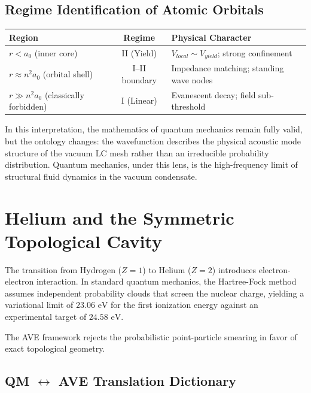 \subsection{Regime Identification of Atomic Orbitals}

\begin{center}
\small
\renewcommand{\arraystretch}{1.2}
\begin{tabular}{lcl}
\toprule
\textbf{Region} & \textbf{Regime} & \textbf{Physical Character} \\
\midrule
$r < a_0$ (inner core) & II (Yield) & $V_{local} \sim V_{yield}$; strong confinement \\
$r \approx n^2 a_0$ (orbital shell) & I--II boundary & Impedance matching; standing wave nodes \\
$r \gg n^2 a_0$ (classically forbidden) & I (Linear) & Evanescent decay; field sub-threshold \\
\bottomrule
\end{tabular}
\end{center}

In this interpretation, the mathematics of quantum mechanics remain fully valid, but the ontology changes: the wavefunction describes the physical acoustic mode structure of the vacuum LC mesh rather than an irreducible probability distribution. Quantum mechanics, under this lens, is the high-frequency limit of structural fluid dynamics in the vacuum condensate.

\section{Helium and the Symmetric Topological Cavity}
\label{sec:helium_symmetric_cavity}

The transition from Hydrogen ($Z=1$) to Helium ($Z=2$) introduces electron-electron interaction. In standard quantum mechanics, the Hartree-Fock method assumes independent probability clouds that screen the nuclear charge, yielding a variational limit of $23.06\text{ eV}$ for the first ionization energy against an experimental target of $24.58\text{ eV}$.

The AVE framework rejects the probabilistic point-particle smearing in favor of exact topological geometry.

\subsection{QM $\leftrightarrow$ AVE Translation Dictionary}
\label{sec:qm_ave_translation}

